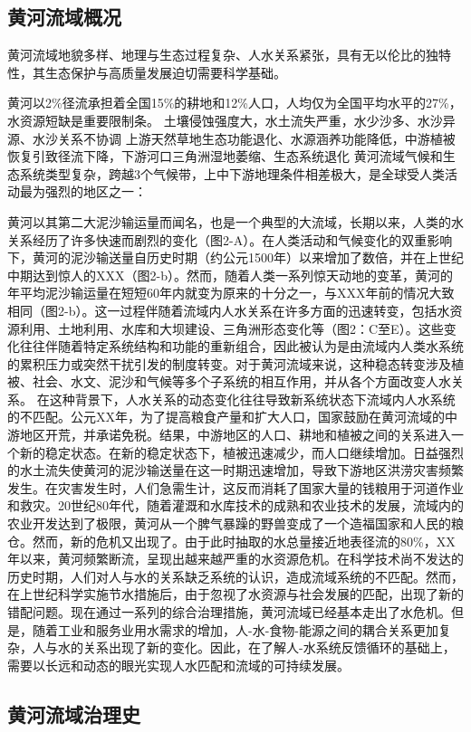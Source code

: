 
\subsection{黄河流域概况}

黄河流域地貌多样、地理与生态过程复杂、人水关系紧张，具有无以伦比的独特性，其生态保护与高质量发展迫切需要科学基础。

黄河以2\%径流承担着全国15\%的耕地和12\%人口，人均仅为全国平均水平的27\%，水资源短缺是重要限制条。
土壤侵蚀强度大，水土流失严重，水少沙多、水沙异源、水沙关系不协调
上游天然草地生态功能退化、水源涵养功能降低，中游植被恢复引致径流下降，下游河口三角洲湿地萎缩、生态系统退化
黄河流域气候和生态系统类型复杂，跨越3个气候带，上中下游地理条件相差极大，是全球受人类活动最为强烈的地区之一：

黄河以其第二大泥沙输运量而闻名，也是一个典型的大流域，长期以来，人类的水关系经历了许多快速而剧烈的变化（图2-A）。在人类活动和气候变化的双重影响下，黄河的泥沙输送量自历史时期（约公元1500年）以来增加了数倍，并在上世纪中期达到惊人的XXX（图2-b）。然而，随着人类一系列惊天动地的变革，黄河的年平均泥沙输运量在短短60年内就变为原来的十分之一，与XXX年前的情况大致相同（图2-b）。这一过程伴随着流域内人水关系在许多方面的迅速转变，包括水资源利用、土地利用、水库和大坝建设、三角洲形态变化等（图2：C至E）。这些变化往往伴随着特定系统结构和功能的重新组合，因此被认为是由流域内人类水系统的累积压力或突然干扰引发的制度转变。对于黄河流域来说，这种稳态转变涉及植被、社会、水文、泥沙和气候等多个子系统的相互作用，并从各个方面改变人水关系。
在这种背景下，人水关系的动态变化往往导致新系统状态下流域内人水系统的不匹配。公元XX年，为了提高粮食产量和扩大人口，国家鼓励在黄河流域的中游地区开荒，并承诺免税。结果，中游地区的人口、耕地和植被之间的关系进入一个新的稳定状态。在新的稳定状态下，植被迅速减少，而人口继续增加。日益强烈的水土流失使黄河的泥沙输送量在这一时期迅速增加，导致下游地区洪涝灾害频繁发生。在灾害发生时，人们急需生计，这反而消耗了国家大量的钱粮用于河道作业和救灾。20世纪80年代，随着灌溉和水库技术的成熟和农业技术的发展，流域内的农业开发达到了极限，黄河从一个脾气暴躁的野兽变成了一个造福国家和人民的粮仓。然而，新的危机又出现了。由于此时抽取的水总量接近地表径流的80\%，XX年以来，黄河频繁断流，呈现出越来越严重的水资源危机。在科学技术尚不发达的历史时期，人们对人与水的关系缺乏系统的认识，造成流域系统的不匹配。然而，在上世纪科学实施节水措施后，由于忽视了水资源与社会发展的匹配，出现了新的错配问题。现在通过一系列的综合治理措施，黄河流域已经基本走出了水危机。但是，随着工业和服务业用水需求的增加，人-水-食物-能源之间的耦合关系更加复杂，人与水的关系出现了新的变化。因此，在了解人-水系统反馈循环的基础上，需要以长远和动态的眼光实现人水匹配和流域的可持续发展。


\subsection{黄河流域治理史}

